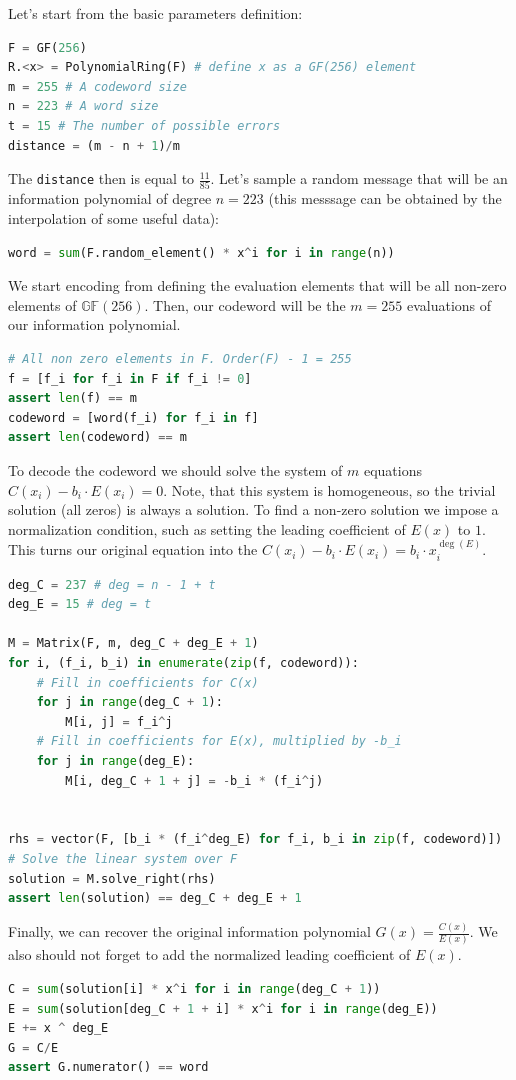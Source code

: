 \documentclass[../lecture-notes-148x210.tex]{subfiles}
\begin{document}
Let's start from the basic parameters definition:
\begin{lstlisting}[language=Python,numbers=none]
F = GF(256)
R.<x> = PolynomialRing(F) # define x as a GF(256) element
m = 255 # A codeword size
n = 223 # A word size
t = 15 # The number of possible errors
distance = (m - n + 1)/m
\end{lstlisting}
The \verb|distance| then is equal to $\frac{11}{85}$. Let's sample a random message that will be an information 
polynomial of degree $n=223$ (this messsage can be obtained by the interpolation of some useful data):
\begin{lstlisting}[language=Python,numbers=none]
word = sum(F.random_element() * x^i for i in range(n))
\end{lstlisting}
We start encoding from defining the evaluation elements that will be all non-zero elements of $\mathbb{GF}(256)$. 
Then, our codeword will be the $m = 255$ evaluations of our information polynomial.
\begin{lstlisting}[language=Python,numbers=none]
# All non zero elements in F. Order(F) - 1 = 255
f = [f_i for f_i in F if f_i != 0]
assert len(f) == m
codeword = [word(f_i) for f_i in f]
assert len(codeword) == m
\end{lstlisting}
To decode the codeword we should solve the system of $m$ equations $C(x_i) - b_i \cdot E(x_i) = 0$. Note, that this system
is homogeneous, so the trivial solution (all zeros) is always a solution. To find a non-zero solution we impose a 
normalization condition, such as setting the leading coefficient of $E(x)$ to $1$. This turns our original equation 
into the $C(x_i) - b_i \cdot E(x_i) = b_i \cdot x_i^{\deg(E)}$.
\begin{lstlisting}[language=Python,numbers=none]
deg_C = 237 # deg = n - 1 + t
deg_E = 15 # deg = t

M = Matrix(F, m, deg_C + deg_E + 1)
for i, (f_i, b_i) in enumerate(zip(f, codeword)):
    # Fill in coefficients for C(x)
    for j in range(deg_C + 1):
        M[i, j] = f_i^j
    # Fill in coefficients for E(x), multiplied by -b_i
    for j in range(deg_E):
        M[i, deg_C + 1 + j] = -b_i * (f_i^j)


rhs = vector(F, [b_i * (f_i^deg_E) for f_i, b_i in zip(f, codeword)])
# Solve the linear system over F
solution = M.solve_right(rhs)
assert len(solution) == deg_C + deg_E + 1
\end{lstlisting}
Finally, we can recover the original information polynomial $G(x) = \frac{C(x)}{E(x)}$. We also should not forget to 
add the normalized leading coefficient of $E(x)$.
\begin{lstlisting}[language=Python,numbers=none]
C = sum(solution[i] * x^i for i in range(deg_C + 1))
E = sum(solution[deg_C + 1 + i] * x^i for i in range(deg_E))
E += x ^ deg_E
G = C/E
assert G.numerator() == word
\end{lstlisting}
\end{document}
